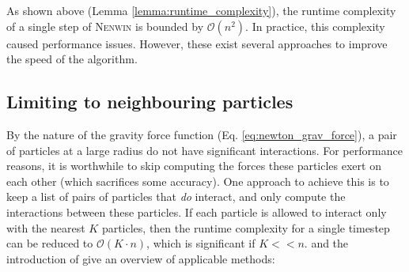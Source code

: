 As shown above (Lemma \ref{lemma:runtime_complexity}), the runtime complexity of a single step of \textsc{Nenwin} is bounded by $\mathcal{O}(n^ 2)$. In practice, this complexity caused performance issues. However, these exist several approaches to improve the speed of the algorithm.

\subsection{Limiting to neighbouring particles}
By the nature of the gravity force function (Eq. \eqref{eq:newton_grav_force}), a pair of particles at a large radius do not have significant interactions. For performance reasons, it is worthwhile to skip computing the forces these particles exert on each other (which sacrifices some accuracy). One approach to achieve this is to keep a list of pairs of particles that \textit{do} interact, and only compute the interactions between these particles. If each particle is allowed to interact only with the nearest $K$ particles, then the runtime complexity for a single timestep can be reduced to $\mathcal{O}(K\cdot n)$, which is significant if $K << n$. \cite{computer_sim_liquids} and the introduction of \cite{heinz_pairlist_alg} give an overview of applicable methods:

